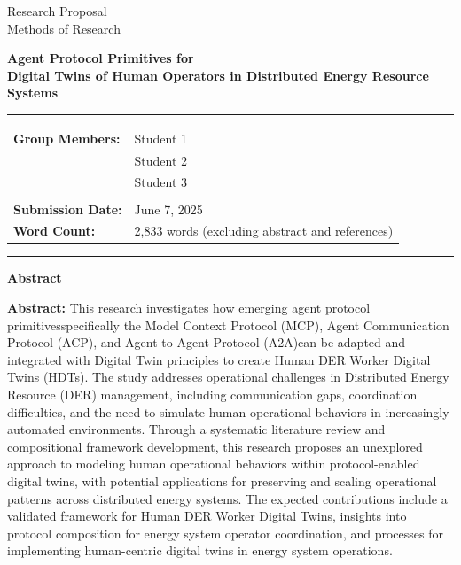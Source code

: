 \documentclass[12pt,a4paper]{article}
\newcommand{\studentone}{Student 1}
\newcommand{\studenttwo}{Student 2}
\newcommand{\studentthree}{Student 3}
\newcommand{\projecttitle}{Agent Protocol Primitives for \\Digital Twins of Human Operators in Distributed Energy Resource Systems}
\newcommand{\submissiondate}{June 7, 2025}
\newcommand{\emdash}{\textemdash}
\begin{document}
\begin{titlepage}
\begin{center}
{\Huge Research Proposal} \\
\vspace{5mm}
{\Large Methods of Research} \\

\vspace{10mm}

{\huge\textbf{\projecttitle}} \\

\vspace{15mm}

\hrule
\vspace{3mm}
\begin{tabular}{ll}
\textbf{Group Members:} & {\studentone} \\
& {\studenttwo} \\
& {\studentthree} \\
\\
\textbf{Submission Date:} & {\submissiondate} \\
\textbf{Word Count:} & 2,833 words (excluding abstract and references) \\
\end{tabular}
\vspace{3mm}
\hrule

\vspace{15mm}

\textbf{Abstract} \\
\vspace{2mm}
\begin{minipage}{0.8\textwidth}
\textbf{Abstract:} This research investigates how emerging agent protocol primitives\emdash specifically the Model Context Protocol (MCP), Agent Communication Protocol (ACP), and Agent-to-Agent Protocol (A2A)\emdash can be adapted and integrated with Digital Twin principles to create Human DER Worker Digital Twins (HDTs). The study addresses operational challenges in Distributed Energy Resource (DER) management, including communication gaps, coordination difficulties, and the need to simulate human operational behaviors in increasingly automated environments. Through a systematic literature review and compositional framework development, this research proposes an unexplored approach to modeling human operational behaviors within protocol-enabled digital twins, with potential applications for preserving and scaling operational patterns across distributed energy systems. The expected contributions include a validated framework for Human DER Worker Digital Twins, insights into protocol composition for energy system operator coordination, and processes for implementing human-centric digital twins in energy system operations.
\end{minipage}

\end{center}
\end{titlepage}
\end{document}
